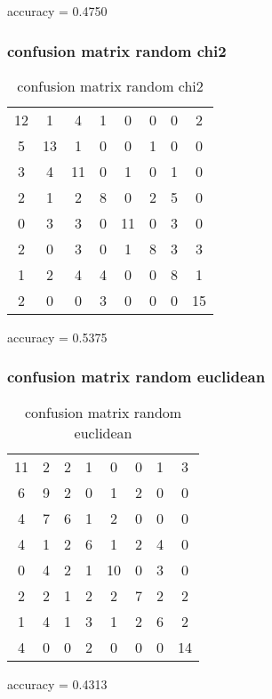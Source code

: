 \documentclass[12pt]{article}
\begin{document}
accuracy = 0.4750


\subsubsection{confusion matrix random chi2}
\begin{table}[H]
\centering
\begin{tabular}{c c c c c c c c}
    12 &     1 &     4 &     1 &     0 &     0 &     0 &     2 \\
     5 &    13 &     1 &     0 &     0 &     1 &     0 &     0 \\
     3 &     4 &    11 &     0 &     1 &     0 &     1 &     0 \\
     2 &     1 &     2 &     8 &     0 &     2 &     5 &     0 \\
     0 &     3 &     3 &     0 &    11 &     0 &     3 &     0 \\
     2 &     0 &     3 &     0 &     1 &     8 &     3 &     3 \\
     1 &     2 &     4 &     4 &     0 &     0 &     8 &     1 \\
     2 &     0 &     0 &     3 &     0 &     0 &     0 &    15 \\
\end{tabular}
\caption{confusion matrix random chi2}
\label{table:randomchi2}
\end{table}

accuracy = 0.5375

\subsubsection{confusion matrix random euclidean}
\begin{table}[H]
\centering
\begin{tabular}{c c c c c c c c}
    11 &     2 &     2 &     1 &     0 &     0 &     1 &     3 \\
     6 &     9 &     2 &     0 &     1 &     2 &     0 &     0 \\
     4 &     7 &     6 &     1 &     2 &     0 &     0 &     0 \\
     4 &     1 &     2 &     6 &     1 &     2 &     4 &     0 \\
     0 &     4 &     2 &     1 &    10 &     0 &     3 &     0 \\
     2 &     2 &     1 &     2 &     2 &     7 &     2 &     2 \\
     1 &     4 &     1 &     3 &     1 &     2 &     6 &     2 \\
     4 &     0 &     0 &     2 &     0 &     0 &     0 &    14 
\end{tabular}
\caption{confusion matrix random euclidean}
\label{table:randomeuc}
\end{table}

accuracy =  0.4313
\end{document}
